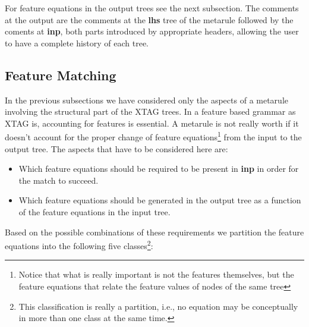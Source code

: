 For feature equations in the output trees see the
next subsection. The comments at the output are the comments at the {\bf lhs}
tree of the metarule followed by the coments at {\bf inp}, both parts 
introduced by appropriate headers, allowing the user to have a complete
history of each tree.

\subsection{Feature Matching}

In the previous subsections we have considered only the aspects of a metarule
involving the structural part of the XTAG trees. In a feature based grammar
as XTAG is, accounting for features is essential. A metarule is not really
worth if it doesn't account for the proper change of feature 
equations\footnote{Notice that what is really important is not the features
themselves, but the feature equations that relate the feature values of nodes
of the same tree} from the input to the output tree. 
The aspects that have to be considered here are:

\begin{itemize}
\item	Which feature equations should be required to be present in {\bf inp}
	in order for the match to succeed.

\item	Which feature equations should be generated in the output tree as a 
	function of the feature equations in the input tree.
\end{itemize}

Based on the possible combinations of these requirements we partition the 
feature equations into the following five classes\footnote{This 
classification is really a partition, i.e., no equation may be conceptually
in more than one class at the same time.}: 

